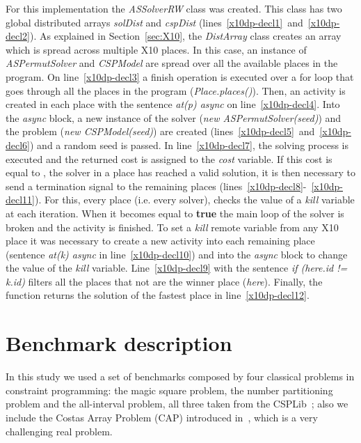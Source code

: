 \documentclass{llncs}
\begin{document}
For this implementation the \emph{ASSolverRW} class was created. This
class has two global distributed arrays \emph{solDist} and
\emph{cspDist} (lines~\ref{x10dp-decl1}~and~\ref{x10dp-decl2}). As
explained in Section~\ref{sec:X10}, the \emph{DistArray} class creates
an array which is spread across multiple X10 places.  In this case, an
instance of \emph{ASPermutSolver} and \emph{CSPModel} are spread over
all the available places in the program. On line~\ref{x10dp-decl3} a
finish operation is executed over a for loop that goes through all the
places in the program (\emph{Place.places()}). Then, an activity is
created in each place with the sentence \emph{at(p) async} on
line~\ref{x10dp-decl4}. Into the \emph{async} block, a new instance of
the solver (\emph{new ASPermutSolver(seed)}) and the problem (\emph{new
  CSPModel(seed)}) are created
(lines~\ref{x10dp-decl5}~and~\ref{x10dp-decl6}) and a random seed is
passed. In line~\ref{x10dp-decl7}, the solving process is executed and
the returned cost is assigned to the \textit{cost} variable. If this
cost is equal to , the solver in a place has reached a valid
solution, it is then necessary to send a termination signal to the
remaining places (lines~\ref{x10dp-decl8}-~\ref{x10dp-decl11}). For
this, every place (i.e. every solver), checks the value of a
\textit{kill} variable at each iteration. When it becomes equal to
\textbf{true} the main loop of the solver is broken and the activity
is finished. To set a \textit{kill} remote variable from any X10 place
it was necessary to create a new activity into each remaining place
(sentence \emph{at(k) async} in line~\ref{x10dp-decl10}) and into the
\emph{async} block to change the value of the \textit{kill}
variable. Line~\ref{x10dp-decl9} with the sentence \emph{if (here.id
  != k.id)} filters all the places that not are the winner place
(\emph{here}). Finally, the function returns the solution of the
fastest place in line~\ref{x10dp-decl12}.



\section{Benchmark description}
\label{sec:eval}
In this study we used a set of benchmarks composed by four classical
problems in constraint programming: the magic square problem, the
number partitioning problem and the all-interval problem, all three
taken from the CSPLib~\cite{I.P.GentT.Walsh}; also we include the
Costas Array Problem (CAP) introduced in~\cite{Kadioglu2009}, which is
a very challenging real problem.
\end{document}
